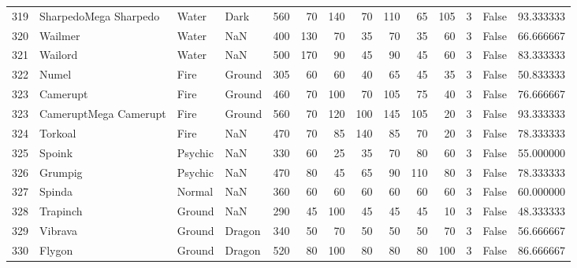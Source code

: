 \begin{tabular}{rlllrrrrrrrrlr}
 319 &      SharpedoMega Sharpedo &     Water &      Dark &    560 &   70 &     140 &       70 &      110 &       65 &    105 &           3 &      False &   93.333333 \\
 320 &                    Wailmer &     Water &       NaN &    400 &  130 &      70 &       35 &       70 &       35 &     60 &           3 &      False &   66.666667 \\
 321 &                    Wailord &     Water &       NaN &    500 &  170 &      90 &       45 &       90 &       45 &     60 &           3 &      False &   83.333333 \\
 322 &                      Numel &      Fire &    Ground &    305 &   60 &      60 &       40 &       65 &       45 &     35 &           3 &      False &   50.833333 \\
 323 &                   Camerupt &      Fire &    Ground &    460 &   70 &     100 &       70 &      105 &       75 &     40 &           3 &      False &   76.666667 \\
 323 &      CameruptMega Camerupt &      Fire &    Ground &    560 &   70 &     120 &      100 &      145 &      105 &     20 &           3 &      False &   93.333333 \\
 324 &                    Torkoal &      Fire &       NaN &    470 &   70 &      85 &      140 &       85 &       70 &     20 &           3 &      False &   78.333333 \\
 325 &                     Spoink &   Psychic &       NaN &    330 &   60 &      25 &       35 &       70 &       80 &     60 &           3 &      False &   55.000000 \\
 326 &                    Grumpig &   Psychic &       NaN &    470 &   80 &      45 &       65 &       90 &      110 &     80 &           3 &      False &   78.333333 \\
 327 &                     Spinda &    Normal &       NaN &    360 &   60 &      60 &       60 &       60 &       60 &     60 &           3 &      False &   60.000000 \\
 328 &                   Trapinch &    Ground &       NaN &    290 &   45 &     100 &       45 &       45 &       45 &     10 &           3 &      False &   48.333333 \\
 329 &                    Vibrava &    Ground &    Dragon &    340 &   50 &      70 &       50 &       50 &       50 &     70 &           3 &      False &   56.666667 \\
 330 &                     Flygon &    Ground &    Dragon &    520 &   80 &     100 &       80 &       80 &       80 &    100 &           3 &      False &   86.666667 \\

\end{tabular}
